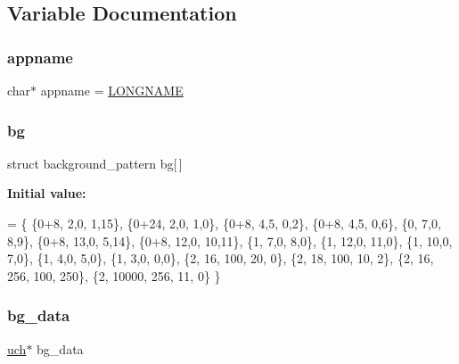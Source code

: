 \subsection{Variable Documentation}
\mbox{\label{rpng2-win_8c_a9db0329b02c3e8e0260939a1c680738a}} 
\subsubsection{\texorpdfstring{appname}{appname}}
{\footnotesize\ttfamily char$\ast$ appname = \mbox{\hyperlink{_visual_png_8c_ae8176192ea4d52bb0acbcfeaaffb3bd8}{L\+O\+N\+G\+N\+A\+ME}}\hspace{0.3cm}{\ttfamily [static]}}

\mbox{\label{rpng2-win_8c_a808fa6d3573a86afa3ba7698a65b1ef6}} 
\subsubsection{\texorpdfstring{bg}{bg}}
{\footnotesize\ttfamily struct background\+\_\+pattern  bg\mbox{[}$\,$\mbox{]}\hspace{0.3cm}{\ttfamily [static]}}

{\bfseries Initial value\+:}
\begin{DoxyCode}
= \{
    \{0+8,   2,0,  1,15\},        
    \{0+24,  2,0,  1,0\},         
    \{0+8,   4,5,  0,2\},         
    \{0+8,   4,5,  0,6\},         
    \{0,     7,0,  8,9\},         
    \{0+8,  13,0,  5,14\},        
    \{0+8,  12,0, 10,11\},        
    \{1,     7,0,  8,0\},         
    \{1,    12,0, 11,0\},         
    \{1,    10,0,  7,0\},         
    \{1,     4,0,  5,0\},         
    \{1,     3,0,  0,0\},         
    \{2,    16, 100,  20,   0\},  
    \{2,    18, 100,  10,   2\},  
    \{2,    16, 256, 100, 250\},  
    \{2, 10000, 256,  11,   0\}   
\}
\end{DoxyCode}
\mbox{\label{rpng2-win_8c_ae7b1caf5caf0f274b142e9792622dac4}} 
\subsubsection{\texorpdfstring{bg\+\_\+data}{bg\_data}}
{\footnotesize\ttfamily \mbox{\hyperlink{readpng_8h_af3307af5922c72924a837559c801a8a4}{uch}}$\ast$ bg\+\_\+data\hspace{0.3cm}{\ttfamily [static]}}

